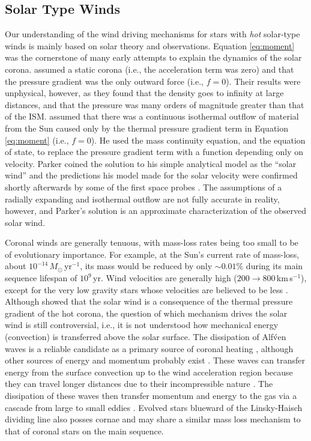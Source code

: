 \subsection{Solar Type Winds}\label{sec:1.4.2}
Our understanding of the wind driving mechanisms for stars with \textit{hot} solar-type winds is mainly based on solar theory and observations. Equation \ref{eq:moment} was the cornerstone of many early attempts to explain the dynamics of the solar corona. \cite{chapman_1957} assumed a static corona (i.e., the acceleration term was zero) and that the pressure gradient was the only outward force (i.e., $f=0$). Their results were unphysical, however, as they found that the density goes to infinity at large distances, and that the pressure was many orders of magnitude greater than that of the ISM. \cite{parker_1958} assumed that there was a continuous isothermal outflow of material from the Sun caused only by the thermal pressure gradient term in Equation \ref{eq:moment} (i.e., $f=0$). He used the mass continuity equation, and the equation of state, to replace the pressure gradient term with a function depending only on velocity. Parker coined the solution to his simple analytical model as the ``solar wind'' and the predictions his model made for the solar velocity were confirmed shortly afterwards by some of the first space probes \citep[e.g.,][]{neugebauer_1962}. The assumptions of a radially expanding and isothermal outflow are not fully accurate in reality, however, and Parker's solution is an approximate characterization of the observed solar wind.

Coronal winds are generally tenuous, with mass-loss rates being too small to be of evolutionary importance. For example, at the Sun's current rate of mass-loss, about $10^{-14}\,M_{\odot}$\,yr$^{-1}$, its mass would be reduced by only $\sim 0.01 \%$ during its main sequence lifespan of $10^9$\,yr. Wind velocities are generally high ($200 \rightarrow 800$\,km\,s$^{-1}$), except for the very low gravity stars whose velocities are believed to be less \cite{drake_1986}. Although \cite{parker_1958} showed that the solar wind is a consequence of the thermal pressure gradient of the hot corona, the question of which mechanism drives the solar wind is still controversial, i.e., it is not understood how mechanical energy (convection) is transferred above the solar surface. The dissipation of Alf\'ven waves is a reliable candidate as a primary source of coronal heating \citep{cranmer_2011}, although other sources of energy and momentum probably exist \cite[e.g.,][]{parker_1983,parker_1988}. These waves can transfer energy from the surface convection up to the wind acceleration region because they can travel longer distances due to their incompressible nature \citep[e.g.,][]{hollweg_1973}. The dissipation of these waves then transfer momentum and energy to the gas via a cascade from large to small eddies \citep{verdini_2007}. Evolved stars blueward of the Linsky-Haisch dividing line also posses cornae and may share a similar mass loss mechanism to that of coronal stars on the main sequence. 

